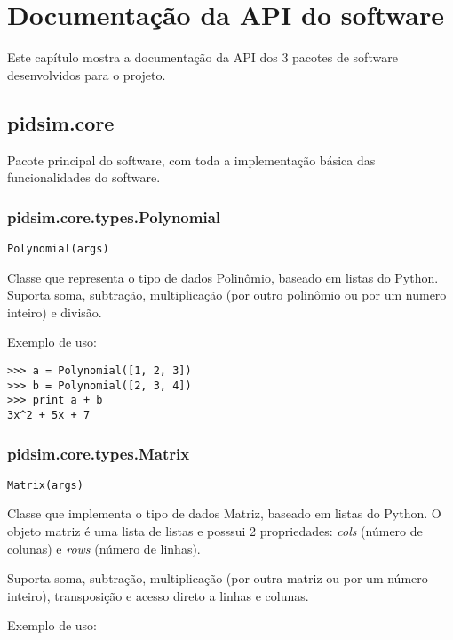 \chapter{Documentação da \acs{API} do software}

    Este capítulo mostra a documentação da \ac{API} dos 3 pacotes de
    software desenvolvidos para o projeto.


\section{pidsim.core}

    Pacote principal do software, com toda a implementação básica das 
    funcionalidades do software.

\subsection{pidsim.core.types.Polynomial}

    \begin{verbatim}
Polynomial(args)\end{verbatim}

    Classe que representa o tipo de dados Polinômio, baseado em listas
    do Python. Suporta soma, subtração, multiplicação (por outro polinômio
    ou por um numero inteiro) e divisão.
    
    Exemplo de uso:

    \begin{verbatim}
>>> a = Polynomial([1, 2, 3])
>>> b = Polynomial([2, 3, 4])
>>> print a + b
3x^2 + 5x + 7\end{verbatim}
    
\subsection{pidsim.core.types.Matrix}

    \begin{verbatim}
Matrix(args)\end{verbatim}

    Classe que implementa o tipo de dados Matriz, baseado em listas do
    Python. O objeto matriz é uma lista de listas e posssui 2 propriedades:
    \textit{cols} (número de colunas) e \textit{rows} (número de linhas).
    
    Suporta soma, subtração, multiplicação (por outra matriz ou por um
    número inteiro), transposição e acesso direto a linhas e colunas.
    
    Exemplo de uso:
    
